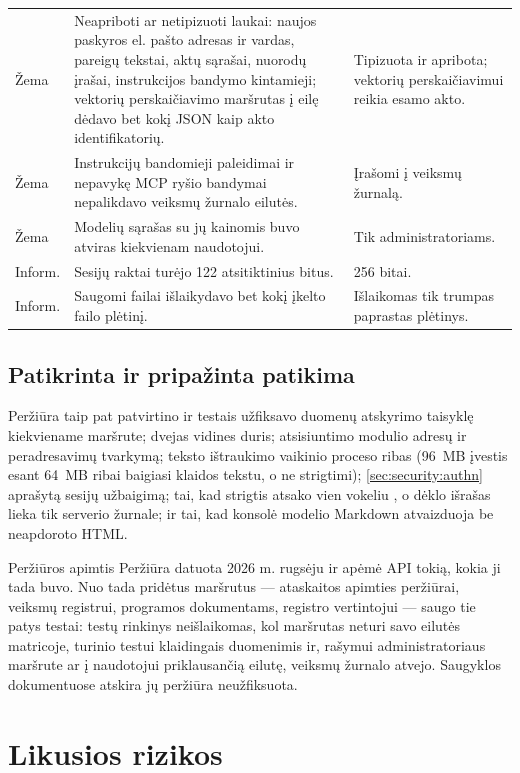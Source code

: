 \begin{xltabular}{\textwidth}{@{}L{15mm}YL{50mm}@{}}
Žema & Neapriboti ar netipizuoti laukai: naujos paskyros el. pašto adresas ir vardas, pareigų tekstai, aktų sąrašai, nuorodų įrašai, instrukcijos bandymo kintamieji; vektorių perskaičiavimo maršrutas į eilę dėdavo bet kokį JSON kaip akto identifikatorių. & Tipizuota ir apribota; vektorių perskaičiavimui reikia esamo akto. \\
Žema & Instrukcijų bandomieji paleidimai ir nepavykę MCP ryšio bandymai nepalikdavo veiksmų žurnalo eilutės. & Įrašomi į veiksmų žurnalą. \\
Žema & Modelių sąrašas su jų kainomis buvo atviras kiekvienam naudotojui. & Tik administratoriams. \\
Inform. & Sesijų raktai turėjo 122 atsitiktinius bitus. & 256 bitai. \\
Inform. & Saugomi failai išlaikydavo bet kokį įkelto failo plėtinį. & Išlaikomas tik trumpas paprastas plėtinys. \\
\end{xltabular}

\subsection{Patikrinta ir pripažinta patikima}

Peržiūra taip pat patvirtino ir testais užfiksavo duomenų atskyrimo taisyklę kiekviename
maršrute; dvejas vidines duris; atsisiuntimo modulio adresų ir peradresavimų tvarkymą;
teksto ištraukimo vaikinio proceso ribas (96~MB įvestis esant 64~MB ribai baigiasi klaidos
tekstu, o ne strigtimi); \cref{sec:security:authn} aprašytą sesijų užbaigimą; tai, kad
strigtis atsako vien vokeliu , o dėklo išrašas lieka tik serverio
žurnale; ir tai, kad konsolė modelio Markdown atvaizduoja be neapdoroto HTML.

\begin{lessonbox}{Peržiūros apimtis}
Peržiūra datuota 2026 m. rugsėju ir apėmė API tokią, kokia ji tada buvo. Nuo tada pridėtus
maršrutus --- ataskaitos apimties peržiūrai, veiksmų registrui, programos dokumentams,
registro vertintojui --- saugo tie patys testai: testų rinkinys neišlaikomas, kol maršrutas
neturi savo eilutės matricoje, turinio testui klaidingais duomenimis ir, rašymui administratoriaus
maršrute ar į naudotojui priklausančią eilutę, veiksmų žurnalo atvejo. Saugyklos dokumentuose
atskira jų peržiūra neužfiksuota.
\end{lessonbox}


\section{Likusios rizikos}\label{sec:security:residual}

